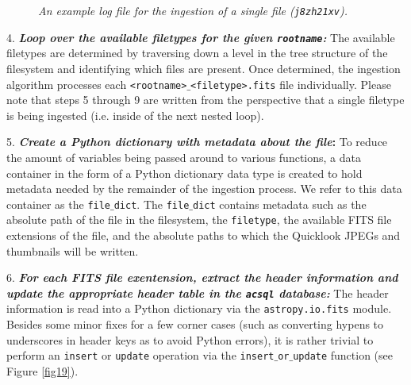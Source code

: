 \documentclass[10pt,journal,compsoc]{IEEEtran}
\begin{document}
\begin{figure}[!t]
\centering
{}
\caption{\textit{An example log file for the ingestion of a single file (\texttt{j8zh21xv}).}}
\label{fig20}
\end{figure}

4. \textbf{\textit{Loop over the available filetypes for the given \texttt{rootname}:}} The available filetypes are determined by traversing down a level in the tree
structure of the filesystem and identifying which files are present. Once determined, the ingestion algorithm processes each \texttt{<rootname>$\_$<filetype>.fits} file individually.
Please note that steps 5 through 9 are written from the perspective that a single filetype is being ingested (i.e. inside of the next nested loop).

5. \textbf{\textit{Create a Python dictionary with metadata about the file}:}  To reduce the amount of variables being passed around to various functions, a data container in the form of
a Python dictionary data type is created to hold metadata needed by the remainder of the ingestion process.  We refer to this data container as the \texttt{file$\_$dict}.  The
\texttt{file$\_$dict} contains metadata such as the absolute path of the file in the filesystem, the \texttt{filetype}, the available FITS file extensions of the file, and the absolute
paths to which the Quicklook JPEGs and thumbnails will be written.

6. \textbf{\textit{For each FITS file exentension, extract the header information and update the appropriate header table in the \texttt{acsql} database:}}  The header information
is read into a Python dictionary via the \texttt{astropy.io.fits} module.  Besides some minor fixes for a few corner cases (such as converting hypens to underscores in header keys as to avoid
Python errors), it is rather trivial to perform an \texttt{insert} or \texttt{update} operation via the \texttt{insert$\_$or$\_$update} function (see Figure \ref{fig19}).
\end{document}
